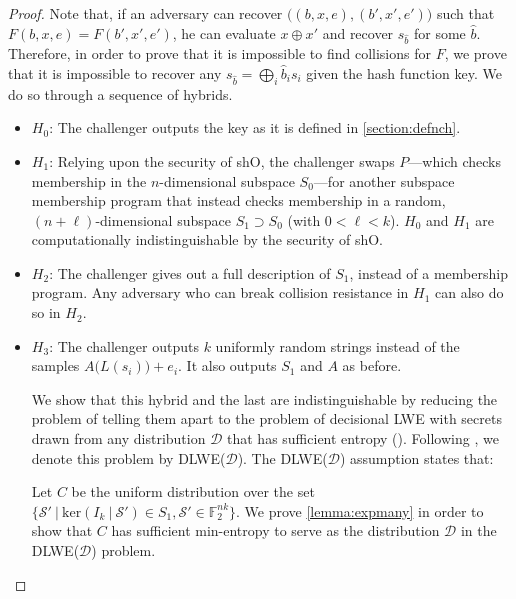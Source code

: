 \documentclass{article}
\begin{document}
\begin{proof}
Note that, if an adversary can recover $\big( (b, x, e), (b', x', e') \big)$ such that $F(b, x, e) = F(b', x', e')$, he can evaluate $x \oplus x'$ and recover $s_{\hat b}$ for some $\hat b$. Therefore, in order to prove that it is impossible to find collisions for $F$, we prove that it is impossible to recover any $s_{\hat b} = \bigoplus_i \hat b_is_i$ given the hash function key. We do so through a sequence of hybrids.

\begin{itemize}
    \item $H_0$: The challenger outputs the key as it is defined in \cref{section:defnch}.
    \item $H_1$: Relying upon the security of \textsf{shO}, the challenger swaps $P$---which checks membership in the $n$-dimensional subspace $S_0$---for another subspace membership program that instead checks membership in a random, $(n+\ell)$-dimensional subspace $S_1 \supset S_0$ (with $0 < \ell < k$). $H_0$ and $H_1$ are computationally indistinguishable by the security of \textsf{shO}.
    \item $H_2$: The challenger gives out a full description of $S_1$, instead of a membership program. Any adversary who can break collision resistance in $H_1$ can also do so in $H_2$.
    \item $H_3$: The challenger outputs $k$ uniformly random strings instead of the samples $A\big( L(s_i) \big) + e_i$. It also outputs $S_1$ and $A$ as before.

We show that this hybrid and the last are indistinguishable by reducing the problem of telling them apart to the problem of decisional LWE with secrets drawn from any distribution $\mathcal{D}$ that has sufficient entropy (\cite{robustness}). Following \cite{robustness}, we denote this problem by \textsf{DLWE}($\mathcal{D}$). The \textsf{DLWE}($\mathcal{D}$) assumption states that:



Let $C$ be the uniform distribution over the set $\big\{ \mathcal{S}' \:\big|\: \mathrm{ker}(I_k \:|\: \mathcal{S}') \in S_1, \mathcal{S}' \in \mathbb{F}_2^{nk} \big\}$. We prove \cref{lemma:expmany} in order to show that $C$ has sufficient min-entropy to serve as the distribution $\mathcal{D}$ in the \textsf{DLWE}($\mathcal{D}$) problem.


\end{itemize}
\end{proof}
\end{document}
